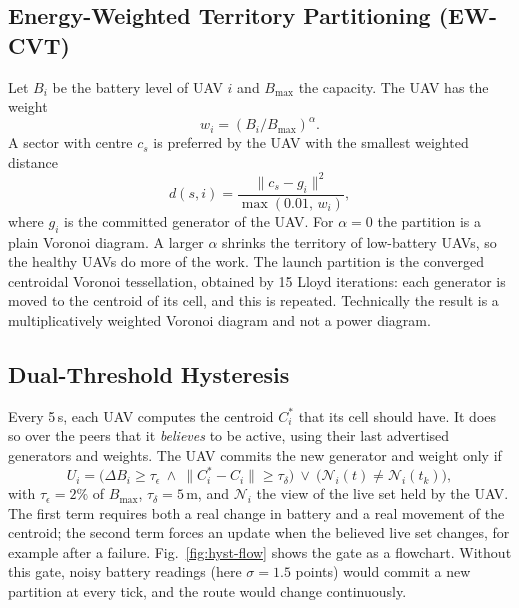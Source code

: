 \documentclass[10pt,letterpaper]{article}
\begin{document}
\subsection{Energy-Weighted Territory Partitioning (EW-CVT)}
Let $B_i$ be the battery level of UAV $i$ and $B_{\max}$ the capacity. The UAV has the weight
\begin{equation}
w_i=(B_i/B_{\max})^{\alpha}.
\end{equation}
A sector with centre $c_s$ is preferred by the UAV with the smallest weighted distance
\begin{equation}
d(s,i)=\frac{\lVert c_s-g_i\rVert^2}{\max(0.01,\,w_i)},\label{eq:pd}
\end{equation}
where $g_i$ is the committed generator of the UAV. For $\alpha=0$ the partition is a plain Voronoi diagram. A larger $\alpha$ shrinks the territory of low-battery UAVs, so the healthy UAVs do more of the work. The launch partition is the converged centroidal Voronoi tessellation, obtained by 15 Lloyd iterations: each generator is moved to the centroid of its cell, and this is repeated. Technically the result is a multiplicatively weighted Voronoi diagram and not a power diagram.

\subsection{Dual-Threshold Hysteresis}
Every 5\,s, each UAV computes the centroid $C_i^*$ that its cell should have. It does so over the peers that it \emph{believes} to be active, using their last advertised generators and weights. The UAV commits the new generator and weight only if
\begin{equation}
U_i=\big(\Delta B_i\ge\tau_\epsilon\ \wedge\ \lVert C_i^*-C_i\rVert\ge\tau_\delta\big)\ \vee\ \big(\mathcal N_i(t)\ne\mathcal N_i(t_k)\big),\label{eq:commit}
\end{equation}
with $\tau_\epsilon=2\%$ of $B_{\max}$, $\tau_\delta=5$\,m, and $\mathcal N_i$ the view of the live set held by the UAV. The first term requires both a real change in battery and a real movement of the centroid; the second term forces an update when the believed live set changes, for example after a failure. Fig.~\ref{fig:hyst-flow} shows the gate as a flowchart. Without this gate, noisy battery readings (here $\sigma=1.5$ points) would commit a new partition at every tick, and the route would change continuously.
\end{document}
